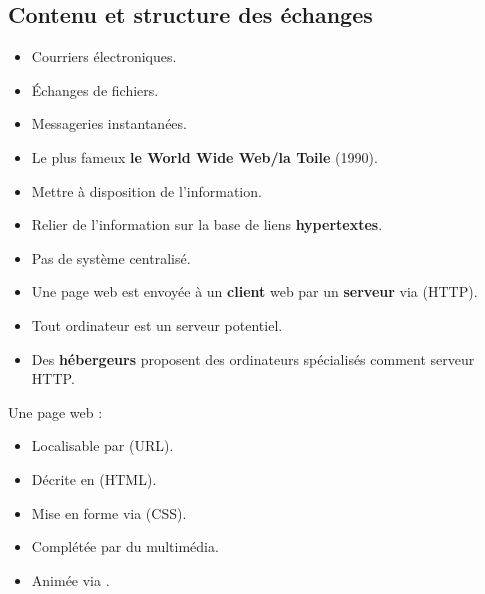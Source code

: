 \subsection{Contenu et structure des échanges} 

\begin{frame}
	\begin{itemize}
		\item Courriers électroniques.
		\item Échanges de fichiers.
		\item Messageries instantanées.
		\item Le plus fameux \textbf{le World Wide Web/la Toile} (1990).
	\end{itemize}
\end{frame}


\begin{frame}
	\begin{itemize}
		\item Mettre à disposition de l'information.
		\item Relier de l'information sur la base de liens \textbf{hypertextes}.
		\item Pas de système centralisé.
	\end{itemize}
\end{frame}

\begin{frame}
	\begin{itemize}
		\item Une page web est envoyée à un \textbf{client} web par un \textbf{serveur} via  (HTTP).
		\item Tout ordinateur est un serveur potentiel.
		\item Des \textbf{hébergeurs} proposent des  ordinateurs spécialisés comment serveur HTTP.
	\end{itemize}
\end{frame}

\begin{frame}
	Une page web :
	\begin{itemize}
		\item Localisable par  (URL).
		\item Décrite en  (HTML).
		\item Mise en forme via  (CSS).
		\item Complétée par du multimédia.
		\item Animée via . %
	\end{itemize}

\end{frame}

